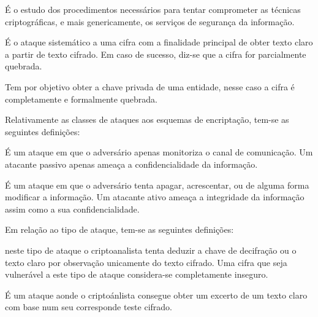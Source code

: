 \begin{definicao}[Criptoanálise] É o estudo dos procedimentos necessários para tentar comprometer as técnicas criptográficas, e mais genericamente, os serviços de segurança da informação.
\end{definicao}

\begin{definicao} É o ataque sistemático a uma cifra com a finalidade principal de obter texto claro a partir de texto cifrado. Em caso de sucesso, diz-se que a cifra for parcialmente quebrada.
\end{definicao}

\begin{definicao} Tem por objetivo obter a chave privada de uma entidade, nesse caso a cifra é completamente e formalmente quebrada.
\end{definicao}

Relativamente as classes de ataques aos esquemas de encriptação, tem-se as seguintes definições:

\begin{definicao} É um ataque em que o adversário apenas monitoriza o canal de comunicação. Um atacante passivo apenas ameaça a confidencialidade da informação.
\end{definicao}

\begin{definicao}
 É um ataque em que o adversário tenta apagar, acrescentar, ou de alguma forma modificar a informação. Um atacante ativo ameaça a integridade da informação assim como a sua confidencialidade.
\end{definicao}

Em relação ao tipo de ataque, tem-se as seguintes definições:

\begin{definicao} neste tipo de ataque o criptoanalista tenta deduzir a chave de decifração ou o texto claro por observação unicamente do texto cifrado. Uma cifra que seja vulnerável a este tipo de ataque considera-se completamente inseguro.
\end{definicao}

\begin{definicao} É um ataque aonde o criptoánlista consegue obter um excerto de um texto claro com base num seu corresponde teste cifrado.
\end{definicao}

